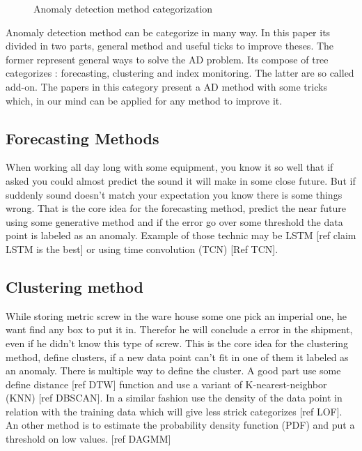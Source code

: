 \documentclass[../../main/main.tex]{subfiles}
\begin{document}
    \begin{figure*}[hp]
        \makebox[\textwidth]{}
        \caption{Anomaly detection method categorization}
    \end{figure*}

    Anomaly detection method can be categorize in many way. In this paper its divided in two parts,
    general method and useful ticks to improve theses. The former represent general ways to 
    solve the AD problem. Its compose of tree categorizes : forecasting, clustering and index monitoring.
    The latter are so called add-on. The papers in this category present a AD method with some tricks which,
    in our mind can be applied for any method to improve it.
    \subsection{Forecasting Methods}
        When working all day long with some equipment, you know it so well that if asked you could almost 
        predict the sound it will make in some close future. But if suddenly sound doesn't match 
        your expectation  you know there is some things wrong.
        That is the core idea for the forecasting method, predict the near future using some generative method
        and if the error go over some threshold the data point is labeled as an anomaly. Example of those technic 
        may be LSTM [ref claim LSTM is the best] or using time convolution (TCN) [Ref TCN].
    
    \subsection{Clustering method}
        While storing metric screw in the ware house some one pick an imperial one, he want find any box to put it in.
        Therefor he will conclude a error in the shipment, even if he didn't know this type of screw. This is the core 
        idea for the clustering method, define clusters, if a new data point can't fit in one of them it labeled as an anomaly.  
        There is multiple way to define the cluster. A good part use some define distance [ref DTW] function and use a variant of K-nearest-neighbor (KNN)
        [ref DBSCAN]. In a similar fashion use the density of the data point in relation with the training data which will 
        give less strick categorizes [ref LOF]. An other method is to estimate the probability density function (PDF) 
        and put a threshold on low values. [ref DAGMM]
        
    
\end{document}
